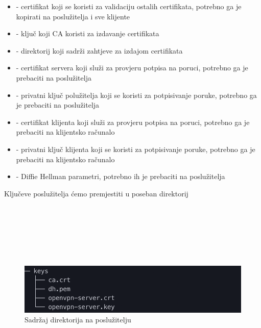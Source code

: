         \begin{itemize}
        \item {} - certifikat koji se koristi za validaciju ostalih
        certifikata, potrebno ga je kopirati na poslužitelja i sve klijente
        \item {} - ključ koji CA koristi za izdavanje certifikata
        \item {} - direktorij koji sadrži zahtjeve za izdajom
        certifikata 
        \item {} - certifikat servera koji služi za
        provjeru potpisa na poruci, potrebno ga je prebaciti na poslužitelja
        \item {} - privatni ključ polužitelja
        koji se koristi za potpisivanje poruke, potrebno ga je prebaciti na
        poslužitelja
        \item {} - certifikat klijenta koji služi za
        provjeru potpisa na poruci, potrebno ga je prebaciti na klijentsko
        računalo
        \item {} - privatni ključ klijenta
        koji se koristi za potpisivanje poruke, potrebno ga je prebaciti na
        klijentsko računalo
        \item {} - Diffie Hellman parametri, potrebno ih je prebaciti na
        poslužitelja
        \end{itemize}

        \noindent
        Ključeve poslužitelja ćemo premjestiti u poseban direktorij \\

        \noindent
         \\
         \\
         \\
         \\
         \\
         \\

        \begin{figure}[H]
            \centering
            \includegraphics[scale=0.7]{slike/serverKeys}
            \caption{Sadržaj  direktorija na poslužitelju}
        \end{figure}

